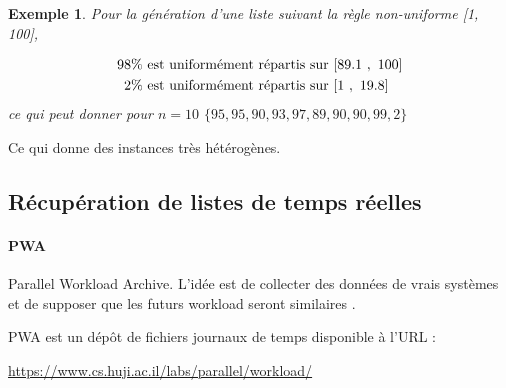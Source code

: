 \documentclass[a4paper,12pt]{report}
\theoremstyle{plain}				%
\newtheorem{example}{Exemple}
\theoremstyle{definition}				%
\newcommand{\lp}[1]{\todo[author=LP,color=yellow,inline]{#1}}
\newcommand{\jb}[1]{\todo[author=JB,color=orange,inline]{#1}}
\begin{document}

\begin{example}
Pour la génération d'une liste suivant la règle non-uniforme [1, 100], 

\begin{align*}
	98 \%  &\textnormal{ est uniformément répartis sur } [89.1~,~ 100] \\
	2\%    &\textnormal{ est uniformément répartis sur } [1   ~,~ 19.8] 
\end{align*}
ce qui peut donner pour $n = 10$
	$\{95, 95, 90, 93, 97, 89, 90, 90, 99, 2\}$
\end{example}
Ce qui donne des instances très hétérogènes. 
 
\subsection{Récupération de listes de temps réelles}\label{ssec:instancesGenerationListesTempsReelles}

\paragraph{PWA} Parallel Workload Archive. L'idée est de collecter des données de vrais systèmes et de 
  supposer que les futurs workload seront similaires \cite{feitelson2014experience}.

   
PWA est un dépôt de fichiers journaux de temps disponible à l'URL :

  
\url{https://www.cs.huji.ac.il/labs/parallel/workload/}
\end{document}
